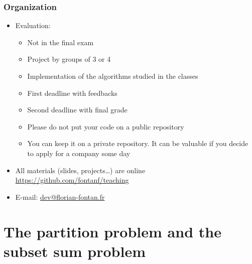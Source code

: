 \documentclass{beamer}
\begin{document}
\begin{frame}
  \frametitle{Organization}
  \begin{itemize}
    \item Evaluation:
      \begin{itemize}
        \item Not in the final exam
        \item Project by groups of 3 or 4
        \item Implementation of the algorithms studied in the classes
        \item First deadline with feedbacks
        \item Second deadline with final grade
        \item Please do not put your code on a public repository
        \item You can keep it on a private repository. It can be valuable if you decide to apply for a company some day
      \end{itemize}
    \item All materials (slides, projects\dots) are online \url{https://github.com/fontanf/teaching}
    \item E-mail: \href{mailto:dev@florian-fontan.fr}{dev@florian-fontan.fr}
  \end{itemize}
\end{frame}

\section{The partition problem and the subset sum problem}
\end{document}
